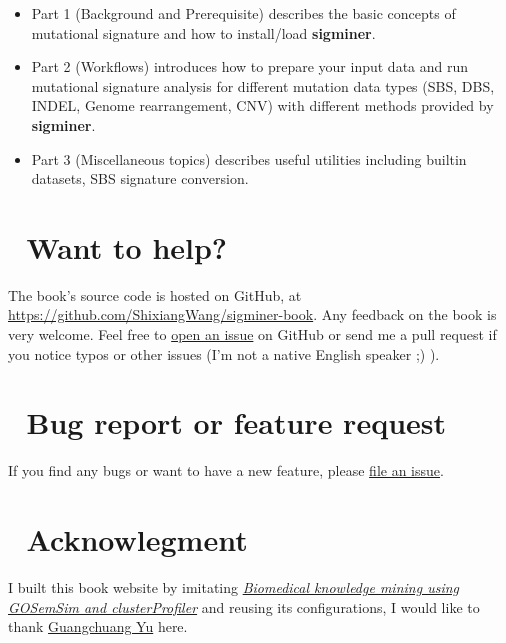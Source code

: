 \documentclass[
  12pt,
  a4paper,
  twoside]{book}
\providecommand{\tightlist}{%
  \setlength{\itemsep}{0pt}\setlength{\parskip}{0pt}}
\begin{document}
\begin{itemize}
\tightlist
\item
  Part 1 (Background and Prerequisite) describes the basic concepts of mutational signature and how to install/load \textbf{sigminer}.
\item
  Part 2 (Workflows) introduces how to prepare your input data and run mutational signature analysis for different mutation data types (SBS, DBS, INDEL, Genome rearrangement, CNV) with different methods provided by \textbf{sigminer}.
\item
  Part 3 (Miscellaneous topics) describes useful utilities including builtin datasets, SBS signature conversion.
\end{itemize}

\hypertarget{want-to-help}{%
\section*{💖 Want to help?}\label{want-to-help}}

The book's source code is hosted on GitHub, at \url{https://github.com/ShixiangWang/sigminer-book}. Any feedback on the book is very welcome. Feel free to \href{https://github.com/ShixiangWang/sigminer-book/issues/new}{open an issue} on GitHub or send me a pull request if you notice typos or other issues (I'm not a native English speaker ;) ).

\hypertarget{bug-report-or-feature-request}{%
\section*{🐜 Bug report or feature request}\label{bug-report-or-feature-request}}

If you find any bugs or want to have a new feature, please \href{https://github.com/ShixiangWang/sigminer/issues/new}{file an issue}.

\hypertarget{acknowlegment}{%
\section*{🌵 Acknowlegment}\label{acknowlegment}}

I built this book website by imitating \href{https://github.com/YuLab-SMU/biomedical-knowledge-mining-book}{\emph{Biomedical knowledge mining using GOSemSim and clusterProfiler}} and reusing its configurations, I would like to thank \href{https://github.com/GuangchuangYu}{Guangchuang Yu} here.
\end{document}
